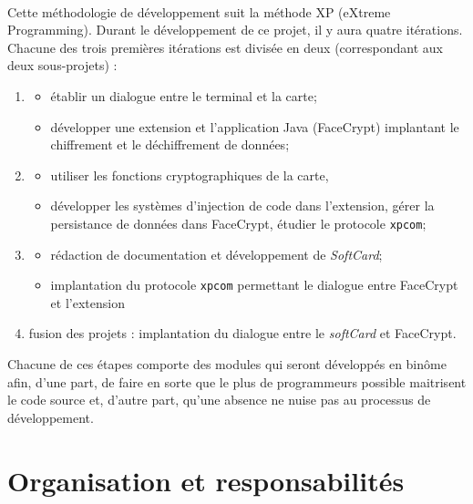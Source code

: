 \documentclass[a4paper,11pt,french]{article}
\begin{document}
\paragraph{}
Cette méthodologie de développement suit la méthode XP (eXtreme Programming). 
Durant le développement de ce projet, il y aura quatre itérations. Chacune des
trois premières itérations est divisée en deux (correspondant
aux deux sous-projets) : 
\begin{enumerate}
 \item \begin{itemize}
            \item établir un dialogue entre le terminal et la carte;
            \item développer une extension et l'application Java (FaceCrypt) implantant
           le chiffrement et le déchiffrement de données; 
       \end{itemize}
 \item \begin{itemize}
            \item utiliser les fonctions cryptographiques de la carte, 
            \item développer les systèmes d'injection de code dans l'extension,
            gérer la persistance de données dans FaceCrypt, étudier
            le protocole \texttt{xpcom};
       \end{itemize}
 \item \begin{itemize}
            \item rédaction de documentation et développement de 
            \emph{SoftCard};
            \item implantation du protocole \texttt{xpcom} permettant
            le dialogue entre FaceCrypt et l'extension
       \end{itemize}
 \item fusion des projets : implantation du dialogue entre le \emph{softCard}
 et FaceCrypt.
\end{enumerate}
Chacune de ces étapes comporte des modules qui seront développés en binôme
afin, d'une part, de faire en sorte que le plus de programmeurs possible
maitrisent le code source et, d'autre part, qu'une absence ne nuise pas au
processus de développement. 

\section{Organisation et responsabilités}
\end{document}
